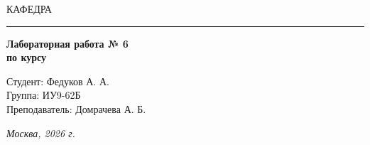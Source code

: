 \begin{titlepage}
  \vspace{0.5ex}
  \hspace{-35pt} \noindent \small КАФЕДРА\hspace{50pt} 

  \vspace*{-16pt}
  \hspace{30pt}\rule{0.866\textwidth}{0.4pt}

  \vspace{11em}

  \begin{center}
    \Large {\bf Лабораторная работа № 6} \\
    \large {\bf по курсу } \\
    \large {}

  \end{center}\normalsize

  \vspace{8em}

  \begin{flushright}
    \begin{minipage}{0.5\linewidth}
      {Студент: Федуков А. А. \hspace*{15pt}\\
        Группа: ИУ9-62Б \\
        Преподаватель: Домрачева А. Б.\hspace*{15pt}}
    \end{minipage}
  \end{flushright}
  \bigskip
  \vfill

  \begin{center}
    \textsl{Москва, 2026 г.}
  \end{center}
\end{titlepage}
